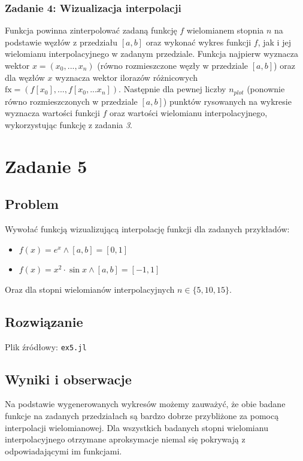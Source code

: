 \documentclass[11pt]{article}
\begin{document}
        \newpage
        \noindent \newline

        \subsubsection*{Zadanie 4: Wizualizacja interpolacji}
        Funkcja powinna zinterpolować zadaną funkcję $f$ wielomianem stopnia $n$ na podstawie węzłów z przedziału
        $[a, b]$ oraz wykonać wykres funkcji $f$, jak i jej wielomianu interpolacyjnego w zadanym przedziale.
        \newline
        Funkcja najpierw wyznacza wektor $x = (x_0, ..., x_n)$ (równo rozmieszczone węzły w przedziale $[a, b]$)
        oraz dla węzłów $x$ wyznacza wektor ilorazów różnicowych $\text{fx} = (f[x_0], ..., f[x_0, ... x_n])$.
        Następnie dla pewnej liczby $n_{plot}$ (ponownie równo rozmieszczonych w przedziale $[a, b]$) punktów rysowanych
        na wykresie wyznacza wartości funkcji $f$ oraz wartości wielomianu interpolacyjnego, wykorzystując funkcję z
        zadania \textit{3}.

    \noindent \newline

\section*{Zadanie 5}
    \subsection*{Problem}
        Wywołać funkcją wizualizującą interpolację funkcji dla zadanych przykładów:
        \begin{itemize}
            \item $f(x) = e^x \land [a, b] = [0, 1]$
            \item $f(x) = x^2 \cdot \sin{x} \land [a, b] = [-1, 1]$
        \end{itemize}
        Oraz dla stopni wielomianów interpolacyjnych $n \in \{5, 10, 15\}$.

    \subsection*{Rozwiązanie}
        Plik źródłowy: \texttt{ex5.jl}

    \subsection*{Wyniki i obserwacje}
        Na podstawie wygenerowanych wykresów możemy zauważyć, że obie badane funkcje na zadanych przedziałach są bardzo
        dobrze przybliżone za pomocą interpolacji wielomianowej. Dla wszystkich badanych stopni wielomianu interpolacyjnego
        otrzymane aproksymacje niemal się pokrywają z odpowiadającymi im funkcjami.
\end{document}
